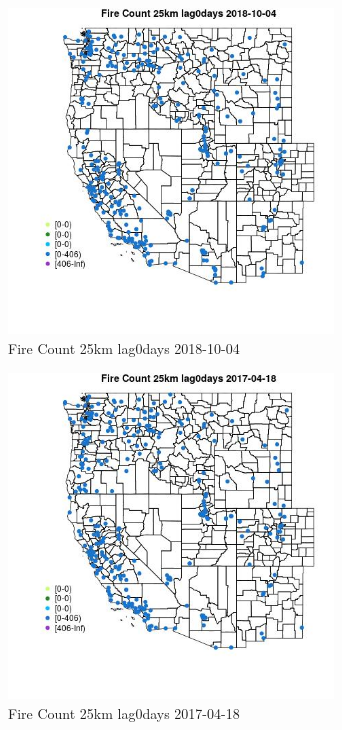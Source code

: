 \begin{figure} 
\centering  
\includegraphics[width=0.77\textwidth]{Code_Outputs/Report_ML_input_PM25_Step4_part_f_de_duplicated_aveswNAs_MapObsFire_Count_25km_lag0days2018-10-04.jpg} 
\caption{\label{fig:Report_ML_input_PM25_Step4_part_f_de_duplicated_aveswNAsMapObsFire_Count_25km_lag0days2018-10-04}Fire Count 25km lag0days 2018-10-04} 
\end{figure} 
 

\begin{figure} 
\centering  
\includegraphics[width=0.77\textwidth]{Code_Outputs/Report_ML_input_PM25_Step4_part_f_de_duplicated_aveswNAs_MapObsFire_Count_25km_lag0days2017-04-18.jpg} 
\caption{\label{fig:Report_ML_input_PM25_Step4_part_f_de_duplicated_aveswNAsMapObsFire_Count_25km_lag0days2017-04-18}Fire Count 25km lag0days 2017-04-18} 
\end{figure} 
 

